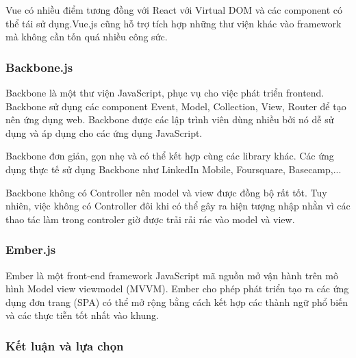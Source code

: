 Vue có nhiều điểm tương đồng với React với Virtual DOM và các component có thể tái sử dụng.Vue.js cũng hỗ trợ tích hợp những thư viện khác vào framework mà không cần tốn quá nhiều công sức.
\subsubsection{Backbone.js}
Backbone là một thư viện JavaScript, phục vụ cho việc phát triển frontend. Backbone sử dụng các component Event, Model, Collection, View, Router để tạo nên ứng dụng web. Backbone được các lập trình viên dùng nhiều bởi nó dễ sử dụng và áp dụng cho các ứng dụng JavaScript.

Backbone đơn giản, gọn nhẹ và có thể kết hợp cùng các library khác. Các ứng dụng thực tế sử dụng Backbone như LinkedIn Mobile, Foursquare, Basecamp,...

Backbone không có Controller nên model và view được đồng bộ rất tốt. Tuy nhiên, việc không có Controller đôi khi có thể gây ra hiện tượng nhập nhằn vì các thao tác làm trong controler giờ được trải rải rác vào model và view.
\subsubsection{Ember.js}
Ember là một front-end framework JavaScript mã nguồn mở vận hành trên mô hình Model view viewmodel (MVVM). Ember cho phép phát triển tạo ra các ứng dụng đơn trang (SPA) có thể mở rộng bằng cách kết hợp các thành ngữ phổ biến và các thực tiễn tốt nhất vào khung.

\subsubsection{Kết luận và lựa chọn}

